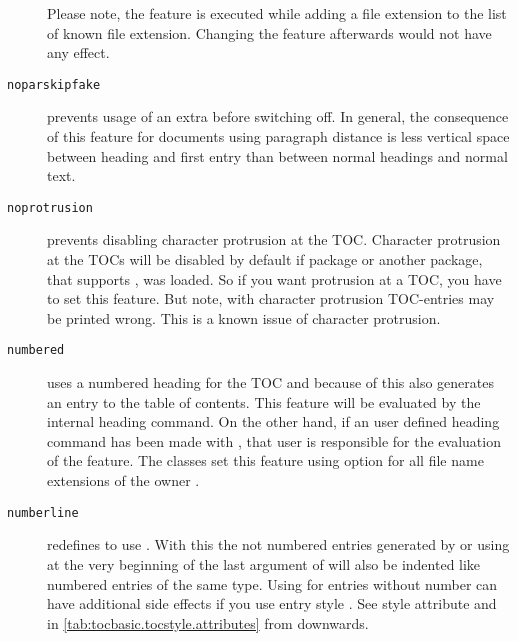 \begin{description}
  Please note, the feature is executed while adding a
  file extension to the list of known file extension. Changing the feature
  afterwards would not have any effect.
\item[\texttt{noparskipfake}] prevents
  usage of an extra  before switching  off. In
  general, the consequence of this feature for documents using paragraph
  distance is less vertical space between heading and first entry than between
  normal headings and normal text.
\item[\texttt{noprotrusion}] prevents
  disabling character protrusion at the TOC. Character protrusion at the TOCs
  will be disabled by default if package
   or another package, that
  supports , was loaded. So if
  you want protrusion at a TOC, you have to set this feature. But
  note, with character protrusion TOC-entries may be
  printed wrong. This is a known issue of character protrusion.
\item[\texttt{numbered}] uses a numbered heading for the TOC and because of
  this also generates an entry to the table of contents. This feature will be
  evaluated by the internal heading command. On the other hand, if an user
  defined heading command has been made with , that user
  is responsible for the evaluation of the feature. The \KOMAScript{} classes
  set this feature using option
   for all file name extensions of the
  owner .
\item[\texttt{numberline}] \leavevmode{}%
  redefines  to use . With this the not
  numbered entries generated by \KOMAScript{} or using  at
  the very beginning of the last argument of  will also
  be indented like numbered entries of the same
  type. Using  for
  entries without number can have
  additional side effects if you use entry style . See style
  attribute  and  in
  \autoref{tab:tocbasic.tocstyle.attributes} from
   downwards.


\end{description}

